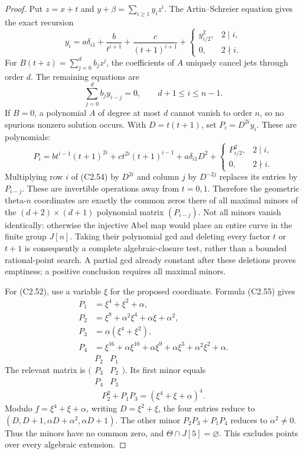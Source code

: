 \begin{proof}
Put $z=x+t$ and $y+\beta=\sum_{i\ge1}y_i z^i$.
The Artin--Schreier equation gives the exact recursion
\[
 y_i=a\delta_{i1}+\frac b{t^{i+1}}+\frac c{(t+1)^{i+1}}
       +\begin{cases}y_{i/2}^2,&2\mid i,\\0,&2\nmid i.\end{cases}
                                                               \tag{C2.53}
\]
For $B(t+z)=\sum_{j=0}^d b_jz^j$, the coefficients
of $A$ uniquely cancel jets through order $d$.
The remaining equations are
\[
             \sum_{j=0}^d b_jy_{i-j}=0,
                         \qquad d+1\le i\le n-1.              \tag{C2.54}
\]
If $B=0$, a polynomial $A$ of degree at most $d$
cannot vanish to order $n$, so no spurious nonzero
solution occurs. With $D=t(t+1)$, set $P_i=D^{2i}y_i$.
These are polynomials:
\[
 P_i=bt^{i-1}(t+1)^{2i}+ct^{2i}(t+1)^{i-1}
       +a\delta_{i1}D^2
       +\begin{cases}P_{i/2}^2,&2\mid i,\\0,&2\nmid i.\end{cases}
                                                               \tag{C2.55}
\]
Multiplying row $i$ of (C2.54) by $D^{2i}$ and
column $j$ by $D^{-2j}$ replaces its entries by
$P_{i-j}$. These are invertible operations away
from $t=0,1$. Therefore the geometric theta-$n$
coordinates are exactly the common zeros there
of all maximal minors of the $(d+2)\times(d+1)$
polynomial matrix $(P_{i-j})$.
Not all minors vanish identically: otherwise the
injective Abel map would place an entire curve
in the finite group $J[n]$.
Taking their polynomial gcd and deleting every
factor $t$ or $t+1$ is consequently a complete
algebraic-closure test, rather than a bounded
rational-point search. A partial gcd already
constant after these deletions proves emptiness;
a positive conclusion requires all maximal minors.

For (C2.52), use a variable $\xi$ for the proposed
coordinate. Formula (C2.55) gives
\[
\begin{aligned}
 P_1&=\xi^4+\xi^2+\alpha,\\
 P_2&=\xi^8+\alpha^2\xi^4+\alpha\xi+\alpha^2,\\
 P_3&=\alpha(\xi^4+\xi^2),\\
 P_4&=\xi^{16}+\alpha\xi^{10}+\alpha\xi^9
                         +\alpha\xi^3+\alpha^2\xi^2+\alpha.
\end{aligned}
\]
The relevant matrix is
$\bigl(\begin{smallmatrix}P_2&P_1\\P_3&P_2\\P_4&P_3\end{smallmatrix}\bigr)$.
Its first minor equals
\[
                 P_2^2+P_1P_3=(\xi^4+\xi+\alpha)^4.
\]
Modulo $f=\xi^4+\xi+\alpha$, writing $D=\xi^2+\xi$,
the four entries reduce to
$(D,D+1,\alpha D+\alpha^2,\alpha D+1)$.
The other minor $P_2P_3+P_1P_4$ reduces to
$\alpha^2\ne0$. Thus the minors have no common
zero, and $\Theta\cap J[5]=\varnothing$.
This excludes points over every algebraic extension.


\end{proof}
